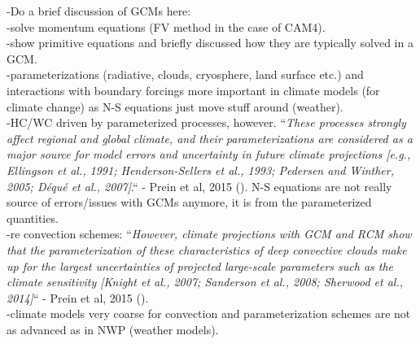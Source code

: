 \documentclass[letterpaper,12pt,titlepage,oneside,final]{book}
\begin{document}
-Do a brief discussion of GCMs here:
\\
-solve momentum equations (FV method in the case of CAM4).
\\
-show primitive equations and briefly discussed how they are typically solved in a GCM.
\\
-parameterizations (radiative, clouds, cryosphere, land surface etc.) and interactions with boundary forcings more important in climate models (for climate change) as N-S equations just move stuff around (weather). 
\\
-HC/WC driven by parameterized processes, however. ``\textit{These processes strongly affect regional and global climate, and their parameterizations are considered as a major source for model errors and uncertainty in future climate projections [e.g., Ellingson et al., 1991; Henderson-Sellers et al., 1993; Pedersen and Winther, 2005; Déqué et al., 2007]}.`` - Prein et al, 2015 (\cite{prein_review_2015}). N-S equations are not really source of errors/issues with GCMs anymore, it is from the parameterized quantities.
\\
-re convection schemes: ``\textit{However, climate projections with GCM and RCM show that the parameterization of these characteristics of deep convective clouds make up for the largest uncertainties of projected large-scale parameters such as the climate sensitivity [Knight et al., 2007; Sanderson et al., 2008; Sherwood et al., 2014]}`` - Prein et al, 2015 (\cite{prein_review_2015}).
\\
-climate models very coarse for convection and parameterization schemes are not as advanced as in NWP (weather models).
\\
\end{document}
